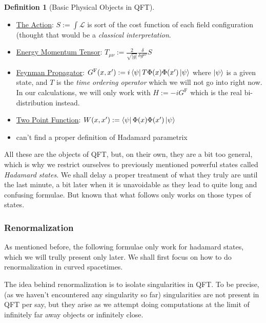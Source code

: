 \documentclass[a4paper,11pt]{article}
\numberwithin{equation}{section}
\theoremstyle{definition}
\newtheorem{definition}{Definition}
\begin{document}
        \begin{definition}[Basic Physical Objects in QFT]$\quad$
        \begin{itemize}
            \item \underline{The Action}: $S:= \int \mathcal{L}$ is sort of the cost function of each field configuration (thought that would be a \emph{classical interpretation}.
            \item \underline{Energy Momentum Tensor}: $T_{\mu\nu}:=\frac{2}{\sqrt{|g|}}\frac{\delta}{\delta g^{\mu\nu}}S$
            \item \underline{Feynman Propagator}: $G^\mathrm{F}(x,x'):=i\bra{\psi}T\Phi(x)\Phi(x')\ket{\psi}$ where $\ket{\psi}$ is a given state, and $T$ is the \emph{time ordering operator} which we will not go into right now. In our calculations, we will only work with $H:=-iG^\mathrm{F}$ which is the real bi-distribution instead.
            \item \underline{Two Point Function}: $W(x,x'):=\bra{\psi}\Phi(x)\Phi(x')\ket{\psi}$
            \item \color{red} can't find a proper definition of Hadamard parametrix\color{black}
        \end{itemize}
        \end{definition}
        All these are the objects of QFT, but, on their own, they are a bit too general, which is why we restrict ourselves to previously mentioned powerful states called \emph{Hadamard states}. We shall delay a proper treatment of what they truly are until the last minute, a bit later when it is unavoidable as they lead to quite long and confusing formulae. But known that what follows only works on those types of states.
\subsubsection{Renormalization}
    As mentioned before, the following formulae only work for hadamard states, which we will trully present only later. We shall first focus on how to do renormalization in curved spacetimes. 

    The idea behind renormalization is to isolate singularities in QFT. To be precise, (as we haven't encountered any singularity so far) singularities are not present in QFT per say, but they arise as we attempt doing computations at the limit of infinitely far away objects or infinitely close.
\end{document}
